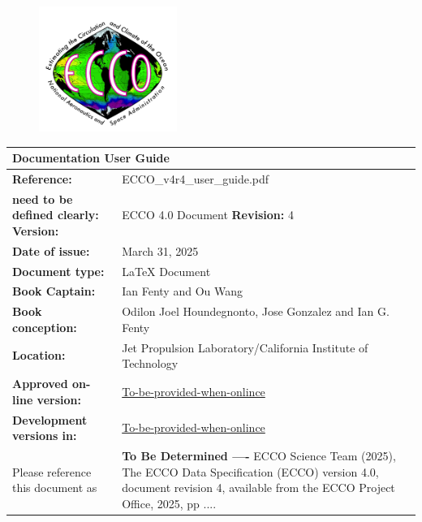 \begin{figure}[t] %
  \centering %
  \includegraphics[width=0.4\textwidth]{../images/ecco_logo_800_726.png} %
\end{figure}

\maketitle
  
\begin{center}
  \begin{tabular}{|p{2in}|p{4in}|}
    \hline
      \multicolumn{2}{|l|}{\textbf{Documentation User Guide}} \\
    \hline
      \textbf{Reference:} & ECCO\_v4r4\_user\_guide.pdf \\
    \hline
      \textbf{need to be defined clearly: Version:} & ECCO 4.0 Document \textbf{Revision:} 4 \\
    \hline
      \textbf{Date of issue:} & March 31, 2025 \\
    \hline
      \textbf{Document type:} & \LaTeX{} Document \\
    \hline
      \textbf{Book Captain:} & Ian Fenty and Ou Wang \\
      \hline
      \textbf{Book conception:} & Odilon Joel Houndegnonto, Jose Gonzalez and Ian G. Fenty \\
    \hline
      \textbf{Location:} & Jet Propulsion Laboratory/California Institute of Technology \\
    \hline
      \textbf{Approved on-line version:} & \url{To-be-provided-when-onlince} \\
    \hline
      \textbf{Development versions in:} & \url{To-be-provided-when-onlince} \\
    \hline
      Please reference this document as & \textbf{To Be Determined ----} ECCO Science Team (2025), The ECCO Data Specification (ECCO) version 4.0, document revision 4, available from the ECCO Project Office, 2025, pp .... \\
    \hline
  \end{tabular}
\end{center}
  
